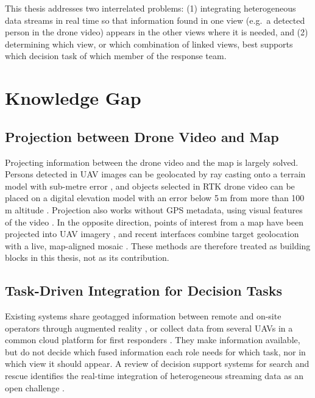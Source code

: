 \documentclass{article}
\begin{document}
This thesis addresses two interrelated problems:
(1) integrating heterogeneous data streams in real time so that information found in one view (e.g.\ a detected person in the drone video) appears in the other views where it is needed, and
(2) determining which view, or which combination of linked views, best supports which decision task of which member of the response team.

\section{Knowledge Gap}

\subsection{Projection between Drone Video and Map}
Projecting information between the drone video and the map is largely solved.
Persons detected in UAV images can be geolocated by ray casting onto a terrain model with sub-metre error \cite{paulin2023raycast}, and objects selected in RTK drone video can be placed on a digital elevation model with an error below 5\,m from more than 100\,m altitude \cite{carvalho2025geolocation}.
Projection also works without GPS metadata, using visual features of the video \cite{nath2022gpsdenied}.
In the opposite direction, points of interest from a map have been projected into UAV imagery \cite{crowley2014aerialar}, and recent interfaces combine target geolocation with a live, map-aligned mosaic \cite{ashry2026uspi}.
These methods are therefore treated as building blocks in this thesis, not as its contribution.

\subsection{Task-Driven Integration for Decision Tasks}
Existing systems share geotagged information between remote and on-site operators through augmented reality \cite{nalamothu2024vizcom}, or collect data from several UAVs in a common cloud platform for first responders \cite{friedrich2022respondrone}.
They make information available, but do not decide which fused information each role needs for which task, nor in which view it should appear.
A review of decision support systems for search and rescue identifies the real-time integration of heterogeneous streaming data as an open challenge \cite{soularidis2024semantic}.
\end{document}
